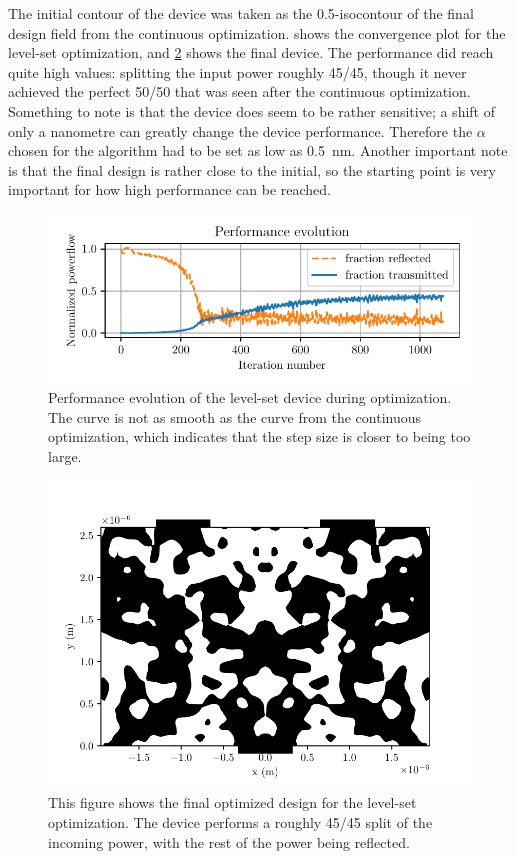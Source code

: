 The initial contour of the device was taken as the 0.5-isocontour of the final
design field from the continuous optimization.
 shows the convergence plot for the level-set optimization,
and \cref{fig:bin_design} shows the final device.
The performance did reach quite high values: splitting the input power roughly
45/45, though it never achieved the perfect 50/50 that was seen after the
continuous optimization.
Something to note is that the device does seem to be rather sensitive;
a shift of only a nanometre can greatly change the device performance.
Therefore the $\alpha$ chosen for the algorithm had to be set as low as
\qty{0.5}{\nm}.
Another important note is that the final design is rather close to the initial,
so the starting point is very important for how high performance can be reached.

\begin{figure}[htpb]
	\centering
	\includegraphics{chapters/results/conv_tmp.pdf}
	\caption{%
		Performance evolution of the level-set device during optimization.
		The curve is not as smooth as the curve from the continuous
		optimization, which indicates that the step size is closer to being too
		large.
	}%
	\label{fig:bin_conv}
\end{figure}

\begin{figure}[htpb]
	\centering
	\includegraphics{chapters/results/bin_design_tmp_254.pdf}
	\caption{%
		This figure shows the final optimized design for the level-set
		optimization. The device performs a roughly 45/45 split of the incoming
		power, with the rest of the power being reflected.
	}%
	\label{fig:bin_design}
\end{figure}
